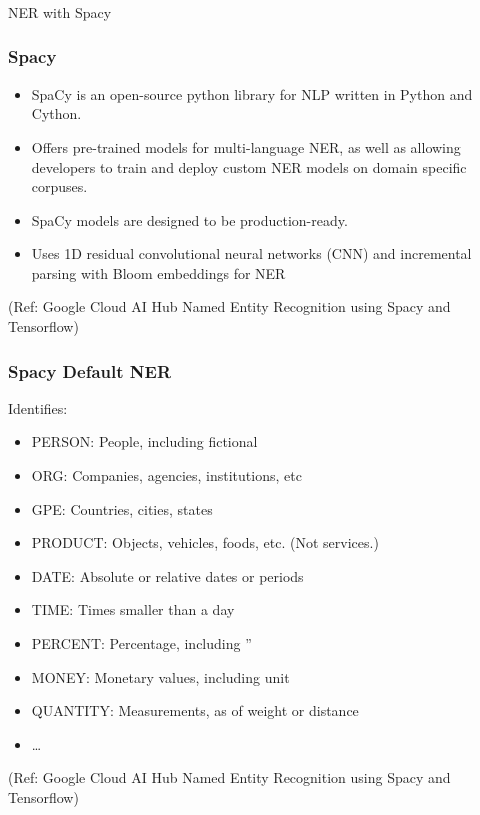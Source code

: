 \begin{frame}[fragile]\frametitle{}

\begin{center}
{\Large NER with Spacy}
\end{center}
\end{frame}


\begin{frame}[fragile]\frametitle{Spacy}
  \begin{itemize}
  \item SpaCy is an open-source python library for NLP written in Python and Cython. 
	\item Offers pre-trained models for multi-language NER, as well as allowing developers to train and deploy custom NER models on domain specific corpuses. 
	\item SpaCy models are designed to be production-ready.
	\item Uses 1D residual convolutional neural networks (CNN) and incremental parsing with Bloom embeddings for NER
  \end{itemize}
	
	{\tiny (Ref: Google Cloud AI Hub Named Entity Recognition using Spacy and Tensorflow)}
\end{frame}

\begin{frame}[fragile]\frametitle{Spacy Default NER}
Identifies:
  \begin{itemize}
  \item PERSON:	People, including fictional
	\item ORG:	Companies, agencies, institutions, etc
	\item GPE:	Countries, cities, states
	\item PRODUCT:	Objects, vehicles, foods, etc. (Not services.)
	\item DATE:	Absolute or relative dates or periods
	\item TIME:	Times smaller than a day
	\item PERCENT:	Percentage, including ”%
	\item MONEY:	Monetary values, including unit
	\item QUANTITY:	Measurements, as of weight or distance
	\item \ldots
  \end{itemize}
	
	{\tiny (Ref: Google Cloud AI Hub Named Entity Recognition using Spacy and Tensorflow)}
\end{frame}

